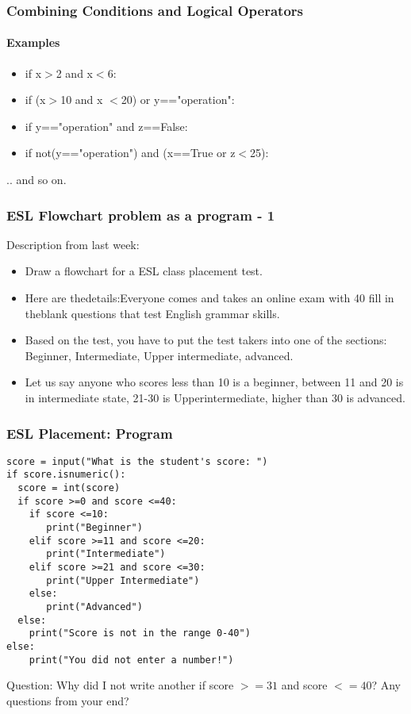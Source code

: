 \documentclass{beamer}
\begin{document}
\begin{frame}
\frametitle{Combining Conditions and Logical Operators}
\framesubtitle{Examples}
\begin{itemize}
\item if x$>$2 and x$<$6:
\item if (x$>$10 and x $<$20) or y=="operation":
\item if y=="operation" and z==False:
\item if not(y=="operation") and (x==True or z$<$25):
\end{itemize}
.. and so on.
\end{frame}

\begin{frame}
\frametitle{ESL Flowchart problem as a program - 1}
Description from last week:
\begin{itemize}
\item Draw a flowchart for a ESL class placement test.  
\item Here are thedetails:Everyone comes and takes an online exam with 40 fill in theblank questions that test English grammar skills.  
\item Based on the test, you have to put the test takers into one of the sections: Beginner, Intermediate, Upper intermediate, advanced.
\item Let us say anyone who scores less than 10 is a beginner, between 11 and 20 is in intermediate state, 21-30 is Upperintermediate, higher than 30 is advanced.
\end{itemize}
\end{frame}

\begin{frame}[fragile]
\frametitle{ESL Placement: Program}
\scriptsize
\begin{verbatim}
score = input("What is the student's score: ")
if score.isnumeric():
  score = int(score)
  if score >=0 and score <=40:
    if score <=10:
       print("Beginner")
    elif score >=11 and score <=20:
       print("Intermediate")
    elif score >=21 and score <=30:
       print("Upper Intermediate")
    else:
       print("Advanced")
  else:
    print("Score is not in the range 0-40") 
else:
    print("You did not enter a number!")
\end{verbatim} \pause
Question: Why did I not write another if score $>=31$ and score $<= 40$? \pause
Any questions from your end?
\end{frame}
\end{document}
